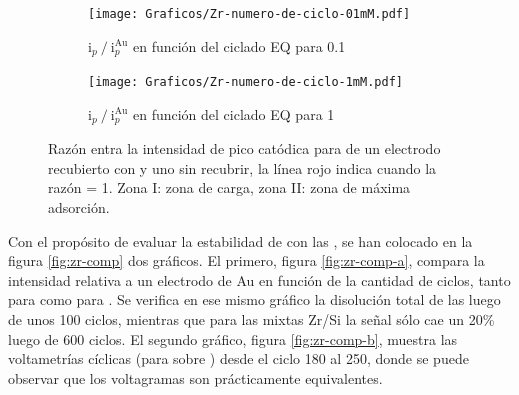			     	\begin{figure}[bh!]
			   	    \begin{subfigure}[t]{0.495\textwidth}
			        	\texttt{[image: Graficos/Zr-numero-de-ciclo-01mM.pdf]}
			        	\vspace*{-10mm}\caption{$\text{i}_p\mathbin{/}\text{i}_p^{\text{Au}}$ en función del ciclado EQ para \ru\space \SI{0.1}{\milli\Molar}}
			         	\end{subfigure}
			     		 \begin{subfigure}[t]{0.495\textwidth}
			        	\texttt{[image: Graficos/Zr-numero-de-ciclo-1mM.pdf]}
			        	\vspace*{-10mm}\caption{$\text{i}_p\mathbin{/}\text{i}_p^{\text{Au}}$ en función del ciclado EQ para \ru\space \SI{1}{\milli\Molar}}
			         	\end{subfigure}
			         	\caption[Intensidad en función del ciclado EQ para \pdmZ]{Razón entra la intensidad de pico catódica para \ru\space de un electrodo recubierto con \pdmZ\space y uno sin recubrir, la línea rojo indica cuando la razón = 1. Zona I: zona de carga, zona II: zona de máxima adsorción.}
			         	\label{fig:ventana-zr}
			     	\end{figure}

		 Con el propósito de evaluar la estabilidad de \pdmZ\space con las \pdmF, se han colocado en la figura \ref{fig:zr-comp} dos gráficos. El primero, figura \ref{fig:zr-comp-a}, compara la intensidad relativa a un electrodo de Au en función de la cantidad de ciclos, tanto para \pdmZ\space como para \pdmF. Se verifica en ese mismo gráfico la disolución total de las \pdmF\space luego de unos 100 ciclos, mientras que para las mixtas Zr/Si la señal sólo cae un 20\% luego de 600 ciclos. El segundo gráfico, figura \ref{fig:zr-comp-b}, muestra las voltametrías cíclicas (para \ru\space sobre \pdmZ) desde el ciclo 180 al 250, donde se puede observar que los voltagramas son prácticamente equivalentes.
		 			
